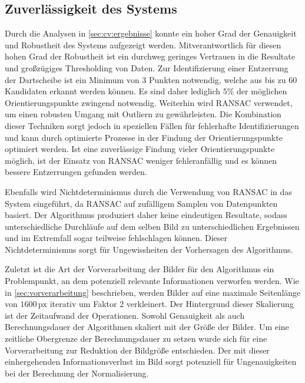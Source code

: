 \subsection{Zuverlässigkeit des Systems}

Durch die Analysen in \autoref{sec:cv:ergebnisse} konnte ein hoher Grad der Genauigkeit und Robustheit des Systems aufgezeigt werden. Mitverantwortlich für diesen hohen Grad der Robustheit ist ein durchweg geringes Vertrauen in die Resultate und großzügiges Thresholding von Daten. Zur Identifizierung einer Entzerrung der Dartscheibe ist ein Minimum von 3 Punkten notwendig, welche aus bis zu 60 Kandidaten erkannt werden können. Es sind daher lediglich $5\%$ der möglichen Orientierungspunkte zwingend notwendig. Weiterhin wird RANSAC verwendet, um einen robusten Umgang mit Outliern zu gewährleisten. Die Kombination dieser Techniken sorgt jedoch in speziellen Fällen für fehlerhafte Identifizierungen und kann durch optimierte Prozesse in der Findung der Orientierungspunkte optimiert werden. Ist eine zuverlässige Findung vieler Orientierungspunkte möglich, ist der Einsatz von RANSAC weniger fehleranfällig und es können bessere Entzerrungen gefunden werden.

Ebenfalls wird Nichtdeterminismus durch die Verwendung von RANSAC in das System eingeführt, da RANSAC auf zufälligem Samplen von Datenpunkten basiert. Der Algorithmus produziert daher keine eindeutigen Resultate, sodass unterschiedliche Durchläufe auf dem selben Bild zu unterschiedlichen Ergebnissen und im Extremfall sogar teilweise fehlschlagen können. Dieser Nichtdeterminismus sorgt für Ungewissheiten der Vorhersagen des Algorithmus.

Zuletzt ist die Art der Vorverarbeitung der Bilder für den Algorithmus ein Problempunkt, an dem potenziell relevante Informationen verworfen werden. Wie in \autoref{sec:vorverarbeitung} beschrieben, werden Bilder auf eine maximale Seitenlänge von $1600\,\text{px}$ iterativ um Faktor 2 verkleinert. Der Hintergrund dieser Skalierung ist der Zeitaufwand der Operationen. Sowohl Genauigkeit als auch Berechnungsdauer der Algorithmen skaliert mit der Größe der Bilder. Um eine zeitliche Obergrenze der Berechnungsdauer zu setzen wurde sich für eine Vorverarbeitung zur Reduktion der Bildgröße entschieden. Der mit dieser einhergehenden Informationsverlust im Bild sorgt potenziell für Ungenauigkeiten bei der Berechnung der Normalisierung.


